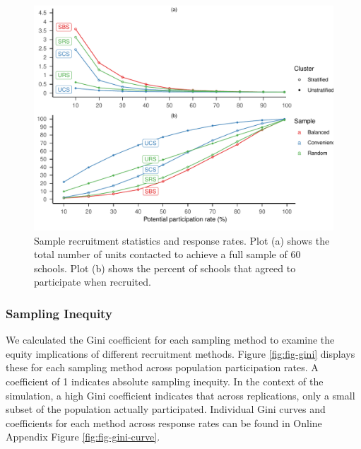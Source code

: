 \documentclass[
  man,floatsintext]{apa6}
\begin{document}
\begin{figure}
\centering
\includegraphics{6---Paper_files/figure-latex/fig-responses-1.pdf}
\caption{\label{fig:fig-responses}Sample recruitment statistics and response rates. Plot (a) shows the total number of units contacted to achieve a full sample of 60 schools. Plot (b) shows the percent of schools that agreed to participate when recruited.}
\end{figure}

\hypertarget{sampling-inequity-1}{%
\subsubsection*{Sampling Inequity}\label{sampling-inequity-1}}

We calculated the Gini coefficient for each sampling method to examine the equity implications of different recruitment methods. Figure \ref{fig:fig-gini} displays these for each sampling method across population participation rates. A coefficient of 1 indicates absolute sampling inequity. In the context of the simulation, a high Gini coefficient indicates that across replications, only a small subset of the population actually participated.   
Individual Gini curves and coefficients for each method across response rates can be found in Online Appendix Figure \ref{fig:fig-gini-curve}.
\end{document}
